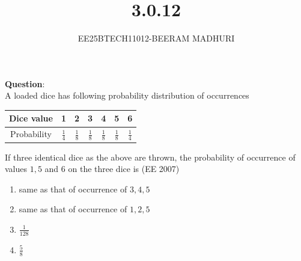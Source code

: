 \documentclass[journal]{IEEEtran}
\begin{document}

\vspace{3cm}

\title{3.0.12}
\author{EE25BTECH11012-BEERAM MADHURI}
{\let\newpage\relax\maketitle}

\renewcommand{\thefigure}{\theenumi}
\renewcommand{\thetable}{\theenumi}
\setlength{\intextsep}{10pt} %


\renewcommand{\thetable}{\theenumi}


\textbf{Question}:\\
A loaded dice has following probability distribution of occurrences

\begin{center}
\begin{tabular}{|c|c|c|c|c|c|c|}
\hline
Dice value & 1 & 2 & 3 & 4 & 5 & 6 \\
\hline
Probability & $\frac{1}{4}$ & $\frac{1}{8}$ & $\frac{1}{8}$ & $\frac{1}{8}$ & $\frac{1}{8}$ & $\frac{1}{4}$ \\
\hline
\end{tabular}
\end{center}

If three identical dice as the above are thrown, the probability of occurrence of values $1, 5$ and $6$ on the three dice is \hfill (EE 2007)

\begin{enumerate}
\item[(a)] same as that of occurrence of $3, 4, 5$
\item[(b)] same as that of occurrence of $1, 2, 5$
\item[(c)] $\frac{1}{128}$
\item[(d)] $\frac{5}{8}$
\end{enumerate}
\end{document}

